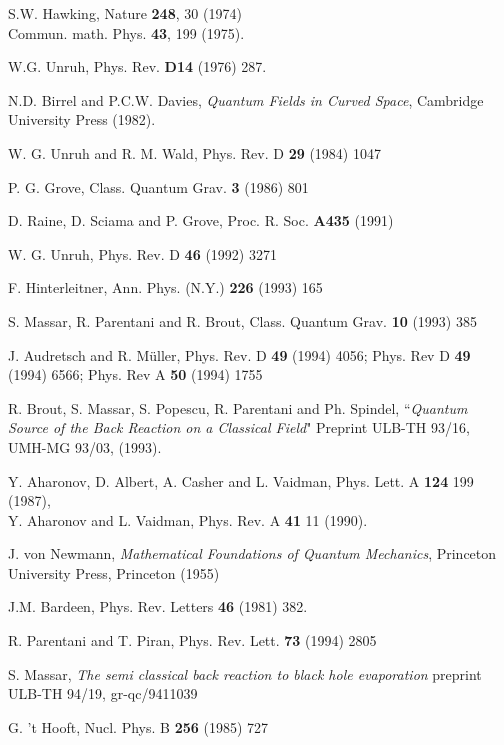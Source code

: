 \begin{thebibliography}{99}


S.W. Hawking, Nature {\bf 248}, 30 (1974)\\
Commun. math. Phys. {\bf 43}, 199 (1975).

 W.G. Unruh, Phys. Rev. {\bf D14} (1976) 287.

N.D. Birrel and P.C.W. Davies, {\it Quantum Fields in Curved
Space},
Cambridge University Press (1982).


W. G. Unruh  and  R. M. Wald, Phys. Rev. D {\bf 29} (1984) 1047


 P. G. Grove, Class. Quantum Grav. {\bf 3} (1986) 801

 D. Raine, D. Sciama and P. Grove, Proc. R. Soc. {\bf A435}
(1991)


W. G. Unruh, Phys. Rev. D {\bf 46} (1992) 3271



 F. Hinterleitner, Ann. Phys. (N.Y.) {\bf 226} (1993) 165


 S. Massar, R. Parentani and R. Brout, Class. Quantum
Grav.
{\bf 10} (1993) 385

J. Audretsch and R. M\"uller, Phys. Rev. D {\bf 49} (1994)
 4056; Phys. Rev D {\bf 49} (1994) 6566;
Phys. Rev A {\bf 50} (1994) 1755



 R. Brout,
 S. Massar,
  S. Popescu,
   R. Parentani and Ph. Spindel, ``{\it Quantum Source of the Back
Reaction on a
 Classical Field}" Preprint ULB-TH 93/16, UMH-MG 93/03, (1993).


Y. Aharonov, D. Albert, A. Casher and L. Vaidman, Phys.
Lett.
A {\bf 124} 199 (1987),\\
Y. Aharonov and L. Vaidman, Phys. Rev. A {\bf 41} 11 (1990).

J. von Newmann, {\em Mathematical Foundations of Quantum
Mechanics}, Princeton University Press, Princeton (1955)


 J.M. Bardeen, Phys. Rev. Letters {\bf 46} (1981)
382.

 R. Parentani and T. Piran,  Phys. Rev. Lett. {\bf 73} (1994)
2805


  S. Massar, {\em The semi classical back reaction to black
hole evaporation} preprint ULB-TH 94/19, gr-qc/9411039

 G. 't Hooft, Nucl. Phys. B {\bf 256} (1985) 727



\end{thebibliography}
